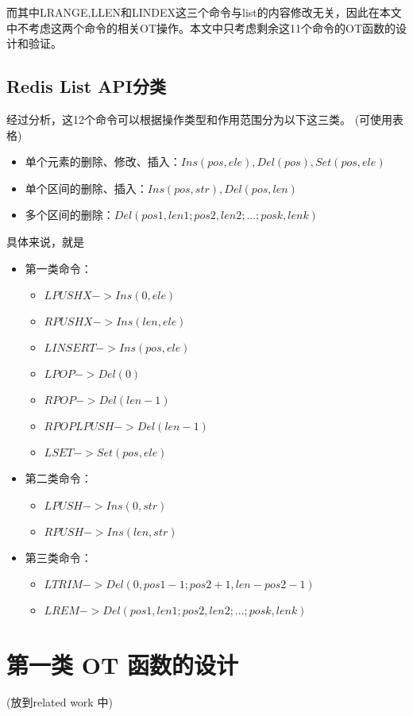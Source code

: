 \par 而其中LRANGE,LLEN和LINDEX这三个命令与list的内容修改无关，因此在本文中不考虑这两个命令的相关OT操作。本文中只考虑剩余这11个命令的OT函数的设计和验证。
\subsection{Redis List API分类}
\par 经过分析，这12个命令可以根据操作类型和作用范围分为以下这三类。
(可使用表格)
\begin{itemize}
\item 单个元素的删除、修改、插入：$ Ins(pos,ele),Del(pos),Set(pos,ele)$\\
\item 单个区间的删除、插入：$Ins(pos,str),Del(pos,len)$\\
\item 多个区间的删除：$ Del(pos1,len1;pos2,len2;...;posk,lenk) $\\
\end{itemize}
\par 具体来说，就是
\begin{itemize}
\item 第一类命令：
	\begin{itemize}
	\item $LPUSHX -> Ins(0,ele)$
	\item $RPUSHX -> Ins(len,ele)$
	\item $LINSERT -> Ins(pos,ele)$
	\item $LPOP -> Del(0)$
	\item $RPOP -> Del(len-1)$
	\item $RPOPLPUSH  -> Del(len-1)$
	\item $LSET -> Set(pos,ele)$
	\end{itemize}
\item 第二类命令：
	\begin{itemize}
	\item $LPUSH -> Ins(0,str)$
	\item $RPUSH -> Ins(len,str)$
	\end{itemize}
\item 第三类命令： 
	\begin{itemize}
	\item $LTRIM -> Del(0,pos1-1;pos2+1,len-pos2-1)$
	\item $LREM ->  Del(pos1,len1;pos2,len2;...;posk,lenk)$
	\end{itemize}
\end{itemize}

\section{第一类 OT 函数的设计}
(放到related work 中)

